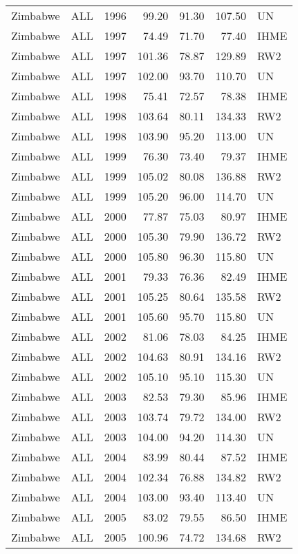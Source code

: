 \begin{longtable}{lllrrrl}
  Zimbabwe & ALL & 1996 & 99.20 & 91.30 & 107.50 & UN \\ 
  Zimbabwe & ALL & 1997 & 74.49 & 71.70 & 77.40 & IHME \\ 
  Zimbabwe & ALL & 1997 & 101.36 & 78.87 & 129.89 & RW2 \\ 
  Zimbabwe & ALL & 1997 & 102.00 & 93.70 & 110.70 & UN \\ 
  Zimbabwe & ALL & 1998 & 75.41 & 72.57 & 78.38 & IHME \\ 
  Zimbabwe & ALL & 1998 & 103.64 & 80.11 & 134.33 & RW2 \\ 
  Zimbabwe & ALL & 1998 & 103.90 & 95.20 & 113.00 & UN \\ 
  Zimbabwe & ALL & 1999 & 76.30 & 73.40 & 79.37 & IHME \\ 
  Zimbabwe & ALL & 1999 & 105.02 & 80.08 & 136.88 & RW2 \\ 
  Zimbabwe & ALL & 1999 & 105.20 & 96.00 & 114.70 & UN \\ 
  Zimbabwe & ALL & 2000 & 77.87 & 75.03 & 80.97 & IHME \\ 
  Zimbabwe & ALL & 2000 & 105.30 & 79.90 & 136.72 & RW2 \\ 
  Zimbabwe & ALL & 2000 & 105.80 & 96.30 & 115.80 & UN \\ 
  Zimbabwe & ALL & 2001 & 79.33 & 76.36 & 82.49 & IHME \\ 
  Zimbabwe & ALL & 2001 & 105.25 & 80.64 & 135.58 & RW2 \\ 
  Zimbabwe & ALL & 2001 & 105.60 & 95.70 & 115.80 & UN \\ 
  Zimbabwe & ALL & 2002 & 81.06 & 78.03 & 84.25 & IHME \\ 
  Zimbabwe & ALL & 2002 & 104.63 & 80.91 & 134.16 & RW2 \\ 
  Zimbabwe & ALL & 2002 & 105.10 & 95.10 & 115.30 & UN \\ 
  Zimbabwe & ALL & 2003 & 82.53 & 79.30 & 85.96 & IHME \\ 
  Zimbabwe & ALL & 2003 & 103.74 & 79.72 & 134.00 & RW2 \\ 
  Zimbabwe & ALL & 2003 & 104.00 & 94.20 & 114.30 & UN \\ 
  Zimbabwe & ALL & 2004 & 83.99 & 80.44 & 87.52 & IHME \\ 
  Zimbabwe & ALL & 2004 & 102.34 & 76.88 & 134.82 & RW2 \\ 
  Zimbabwe & ALL & 2004 & 103.00 & 93.40 & 113.40 & UN \\ 
  Zimbabwe & ALL & 2005 & 83.02 & 79.55 & 86.50 & IHME \\ 
  Zimbabwe & ALL & 2005 & 100.96 & 74.72 & 134.68 & RW2 \\ 

\end{longtable}
